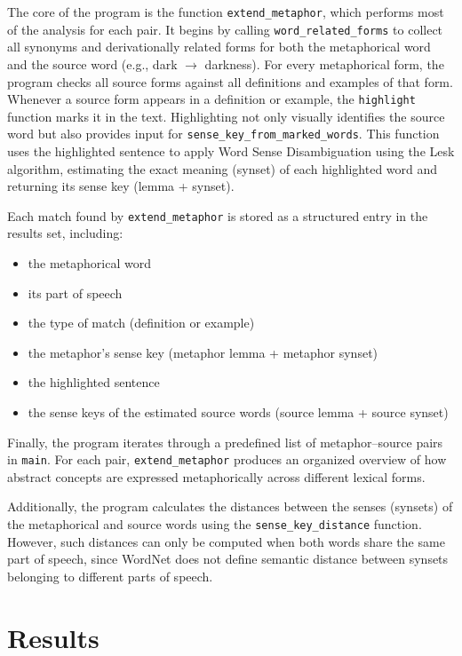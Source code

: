 \documentclass[12pt,a4paper]{article}
\begin{document}
The core of the program is the function \texttt{extend\_metaphor}, which performs most of the analysis for each pair. It begins by calling \texttt{word\_related\_forms} to collect all synonyms and derivationally related forms for both the metaphorical word and the source word (e.g., dark $\rightarrow$ darkness). For every metaphorical form, the program checks all source forms against all definitions and examples of that form. Whenever a source form appears in a definition or example, the \texttt{highlight} function marks it in the text. Highlighting not only visually identifies the source word but also provides input for \texttt{sense\_key\_from\_marked\_words}. This function uses the highlighted sentence to apply Word Sense Disambiguation using the Lesk algorithm, estimating the exact meaning (synset) of each highlighted word and returning its sense key (lemma + synset).

Each match found by \texttt{extend\_metaphor} is stored as a structured entry in the results set, including:

\begin{itemize}
\item the metaphorical word
\item its part of speech
\item the type of match (definition or example)
\item the metaphor’s sense key (metaphor lemma + metaphor synset)
\item the highlighted sentence
\item the sense keys of the estimated source words (source lemma + source synset)
\end{itemize}

Finally, the program iterates through a predefined list of metaphor--source pairs in \texttt{main}. For each pair, \texttt{extend\_metaphor} produces an organized overview of how abstract concepts are expressed metaphorically across different lexical forms.

Additionally, the program calculates the distances between the senses (synsets) of the metaphorical and source words using the \texttt{sense\_key\_distance} function. However, such distances can only be computed when both words share the same part of speech, since WordNet does not define semantic distance between synsets belonging to different parts of speech.

\section{Results}
\label{sec:results}
\end{document}
